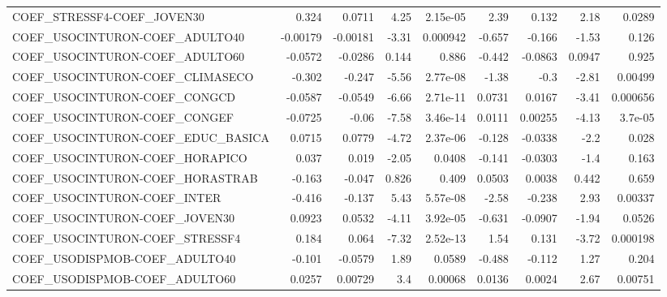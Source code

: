 \begin{tabular}{lrrrrrrrr}
COEF\_STRESSF4-COEF\_JOVEN30            &       0.324 &       0.0711 &     4.25 & 2.15e-05 &       2.39 &       0.132 &         2.18 &        0.0289 \\
COEF\_USOCINTURON-COEF\_ADULTO40        &    -0.00179 &     -0.00181 &    -3.31 & 0.000942 &     -0.657 &      -0.166 &        -1.53 &         0.126 \\
COEF\_USOCINTURON-COEF\_ADULTO60        &     -0.0572 &      -0.0286 &    0.144 &    0.886 &     -0.442 &     -0.0863 &       0.0947 &         0.925 \\
COEF\_USOCINTURON-COEF\_CLIMASECO       &      -0.302 &       -0.247 &    -5.56 & 2.77e-08 &      -1.38 &        -0.3 &        -2.81 &       0.00499 \\
COEF\_USOCINTURON-COEF\_CONGCD          &     -0.0587 &      -0.0549 &    -6.66 & 2.71e-11 &     0.0731 &      0.0167 &        -3.41 &      0.000656 \\
COEF\_USOCINTURON-COEF\_CONGEF          &     -0.0725 &        -0.06 &    -7.58 & 3.46e-14 &     0.0111 &     0.00255 &        -4.13 &       3.7e-05 \\
COEF\_USOCINTURON-COEF\_EDUC\_BASICA     &      0.0715 &       0.0779 &    -4.72 & 2.37e-06 &     -0.128 &     -0.0338 &         -2.2 &         0.028 \\
COEF\_USOCINTURON-COEF\_HORAPICO        &       0.037 &        0.019 &    -2.05 &   0.0408 &     -0.141 &     -0.0303 &         -1.4 &         0.163 \\
COEF\_USOCINTURON-COEF\_HORASTRAB       &      -0.163 &       -0.047 &    0.826 &    0.409 &     0.0503 &      0.0038 &        0.442 &         0.659 \\
COEF\_USOCINTURON-COEF\_INTER           &      -0.416 &       -0.137 &     5.43 & 5.57e-08 &      -2.58 &      -0.238 &         2.93 &       0.00337 \\
COEF\_USOCINTURON-COEF\_JOVEN30         &      0.0923 &       0.0532 &    -4.11 & 3.92e-05 &     -0.631 &     -0.0907 &        -1.94 &        0.0526 \\
COEF\_USOCINTURON-COEF\_STRESSF4        &       0.184 &        0.064 &    -7.32 & 2.52e-13 &       1.54 &       0.131 &        -3.72 &      0.000198 \\
COEF\_USODISPMOB-COEF\_ADULTO40         &      -0.101 &      -0.0579 &     1.89 &   0.0589 &     -0.488 &      -0.112 &         1.27 &         0.204 \\
COEF\_USODISPMOB-COEF\_ADULTO60         &      0.0257 &      0.00729 &      3.4 &  0.00068 &     0.0136 &      0.0024 &         2.67 &       0.00751 \\

\end{tabular}

